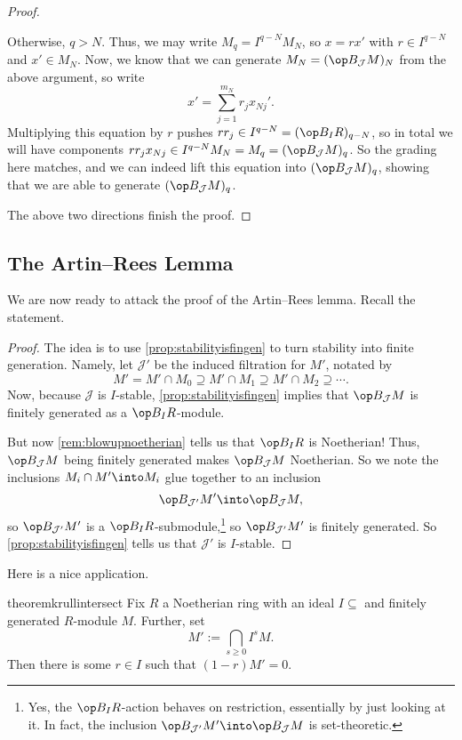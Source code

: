 \begin{proof}
\begin{itemize}
		Otherwise, $q>N$. Thus, we may write $M_q=I^{q-N}M_N$, so $x=rx'$ with $r\in I^{q-N}$ and $x'\in M_N$. Now, we know that we can generate $M_N=(\op B_\mathcal JM)_N$ from the above argument, so write
		\[x'=\sum_{j=1}^{m_N}r_jx_{Nj}'.\]
		Multiplying this equation by $r$ pushes $rr_j\in I^{q-N}=(\op B_IR)_{q-N}$, so in total we will have components $rr_jx_{Nj}\in I^{q-N}M_N=M_q=(\op B_\mathcal JM)_q$. So the grading here matches, and we can indeed lift this equation into $(\op B_\mathcal JM)_q$, showing that we are able to generate $(\op B_\mathcal JM)_q$.
	\end{itemize}
	The above two directions finish the proof.
\end{proof}

\subsection{The Artin--Rees Lemma}
We are now ready to attack the proof of the Artin--Rees lemma. Recall the statement.
\artinrees*
\begin{proof}
	The idea is to use \autoref{prop:stabilityisfingen} to turn stability into finite generation. Namely, let $\mathcal J'$ be the induced filtration for $M'$, notated by
	\[M'=M'\cap M_0\supseteq M'\cap M_1\supseteq M'\cap M_2\supseteq\cdots.\]
	Now, because $\mathcal J$ is $I$-stable, \autoref{prop:stabilityisfingen} implies that $\op B_\mathcal JM$ is finitely generated as a $\op B_IR$-module.

	But now \autoref{rem:blowupnoetherian} tells us that $\op B_IR$ is Noetherian! Thus, $\op B_\mathcal JM$ being finitely generated makes $\op B_\mathcal JM$ Noetherian. So we note the inclusions $M_i\cap M'\into M_i$ glue together to an inclusion
	\[\op B_{\mathcal J'}M'\into\op B_\mathcal JM,\]
	so $\op B_{\mathcal J'}M'$ is a $\op B_IR$-submodule,\footnote{Yes, the $\op B_IR$-action behaves on restriction, essentially by just looking at it. In fact, the inclusion $\op B_{\mathcal J'}M'\into\op B_\mathcal JM$ is set-theoretic.} so $\op B_{\mathcal J'}M'$ is finitely generated. So \autoref{prop:stabilityisfingen} tells us that $\mathcal J'$ is $I$-stable.
\end{proof}
Here is a nice application.
\begin{restatable}{theorem}{krullintersect} \label{thm:krullintersect}
	Fix $R$ a Noetherian ring with an ideal $I\subseteq $ and finitely generated $R$-module $M$. Further, set
	\[M':=\bigcap_{s\ge0}I^sM.\]
	Then there is some $r\in I$ such that $(1-r)M'=0$.
\end{restatable}
